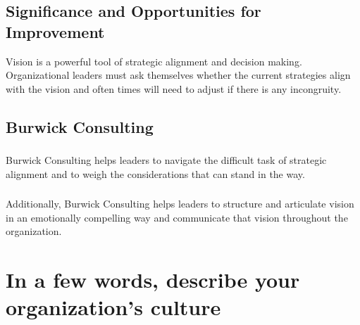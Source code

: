 \documentclass[14pt]{extreport}
\begin{document}
\subsection*{\centering Significance and Opportunities for Improvement}
Vision is a powerful tool of strategic alignment and decision
making. Organizational leaders must ask themselves whether the
current strategies align with the vision and often times will need
to adjust if there is any incongruity.
\subsection*{\centering Burwick Consulting}
\subsubsection*{}
Burwick Consulting helps leaders to navigate the difficult task of
strategic alignment and to weigh the considerations that can
stand in the way.
\subsubsection*{}
Additionally, Burwick Consulting helps leaders to structure and articulate
vision in an emotionally compelling way and communicate that
vision throughout the organization.

\newpage
\section*{In a few words, describe your organization's culture}
\end{document}
